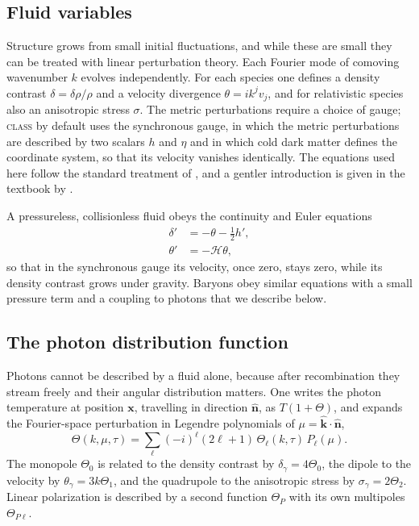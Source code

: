 \documentclass[11pt,a4paper]{article}
\begin{document}
\subsection{Fluid variables}

Structure grows from small initial fluctuations, and while these are small they can be treated with linear perturbation theory. Each Fourier mode of comoving wavenumber $k$ evolves independently. For each species one defines a density contrast $\delta = \delta\rho/\rho$ and a velocity divergence $\theta = ik^j v_j$, and for relativistic species also an anisotropic stress $\sigma$. The metric perturbations require a choice of gauge; \textsc{class} by default uses the synchronous gauge, in which the metric perturbations are described by two scalars $h$ and $\eta$ and in which cold dark matter defines the coordinate system, so that its velocity vanishes identically. The equations used here follow the standard treatment of \citet{MaBertschinger1995}, and a gentler introduction is given in the textbook by \citet{DodelsonSchmidt2020}.

A pressureless, collisionless fluid obeys the continuity and Euler equations
\begin{align}
\delta' &= -\theta - \tfrac12 h', \label{eq:cont}\\
\theta' &= -\mathcal{H}\theta, \label{eq:euler}
\end{align}
so that in the synchronous gauge its velocity, once zero, stays zero, while its density contrast grows under gravity. Baryons obey similar equations with a small pressure term and a coupling to photons that we describe below.

\subsection{The photon distribution function}

Photons cannot be described by a fluid alone, because after recombination they stream freely and their angular distribution matters. One writes the photon temperature at position $\mathbf{x}$, travelling in direction $\hat{\mathbf n}$, as $T(1+\Theta)$, and expands the Fourier-space perturbation in Legendre polynomials of $\mu = \hat{\mathbf k}\cdot\hat{\mathbf n}$,
\begin{equation}
\Theta(k,\mu,\tau) = \sum_{\ell} (-i)^\ell (2\ell+1)\,\Theta_\ell(k,\tau)\,P_\ell(\mu).
\end{equation}
The monopole $\Theta_0$ is related to the density contrast by $\delta_\gamma = 4\Theta_0$, the dipole to the velocity by $\theta_\gamma = 3k\Theta_1$, and the quadrupole to the anisotropic stress by $\sigma_\gamma = 2\Theta_2$. Linear polarization is described by a second function $\Theta_P$ with its own multipoles $\Theta_{P\ell}$.
\end{document}
